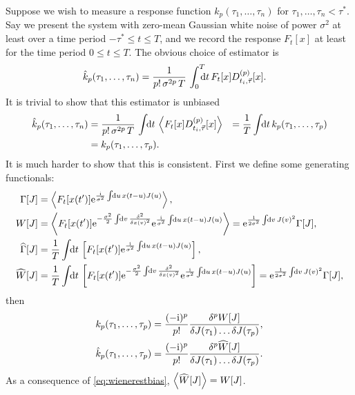 \documentclass[12pt]{article}
\theoremstyle{slplain}
\theoremstyle{sldefinition}
\theoremstyle{remark}
\newcommand{\hz}{\widehat{\Gamma}}
\newcommand{\hw}{\widehat{W}}
\begin{document}
Suppose we wish to measure a response function $k_p(\tau_1,\ldots,\tau_n)$ for $\tau_1,\ldots,\tau_n < \tau^*$. Say we present the system with zero-mean Gaussian white noise of power $\sigma^2$ at least over a time period $-\tau^* \leq t \leq T$, and we record the response $F_t[x]$ at least for the time period $0 \leq t \leq T$. The obvious choice of estimator is
%
\begin{equation}\label{eq:wienerest}
  \begin{aligned}
    \hat{k}_p(\tau_1,\ldots,\tau_n) &= \frac{1}{p!\,\sigma^{2p}\,T} \, \intd[_0^T\!\!]{t} F_t[x] D\rp{p}_{t_i,\vec{\tau}}[x] .
  \end{aligned}
\end{equation}
%
It is trivial to show that this estimator is unbiased
%
\begin{equation}\label{eq:wienerestbias}
  \begin{aligned}
    \hat{k}_p(\tau_1,\ldots,\tau_n) &= \frac{1}{p!\,\sigma^{2p}\,T} \, \intd{t} \av{F_t[x] D\rp{p}_{t_i,\vec{\tau}}[x]}
      &= \frac{1}{T}\intd{t}k_p(\tau_1,\ldots,\tau_p) \\
      &= k_p(\tau_1,\ldots,\tau_p).
  \end{aligned}
\end{equation}
%
It is much harder to show that this is consistent. First we define some generating functionals:
%
\begin{equation}\label{eq:wienergen}
  \begin{aligned}
    \Gamma[J] &= \av{F_t[x(t')] \e^{\frac{\ir}{\sigma^2} \intd{u} x(t-u)J(u)}},  \\
    W[J] &= \av{F_t[x(t')] \e^{-\frac{\sigma^2}{2} \intd{v}\fdf{^2}{x(v)^2}} \e^{\frac{\ir}{\sigma^2} \intd{u} x(t-u)J(u)}}
     = \e^{\frac{1}{2\sigma^2} \intd{v}J(v)^2} \Gamma[J],  \\
    \hz[J] &= \frac{1}{T}\intd{t} \brk{F_t[x(t')] \e^{\frac{\ir}{\sigma^2} \intd{u} x(t-u)J(u)}},  \\
    \hw[J] &= \frac{1}{T}\intd{t} \brk{F_t[x(t')] \e^{-\frac{\sigma^2}{2} \intd{v}\fdf{^2}{x(v)^2}} \e^{\frac{\ir}{\sigma^2} \intd{u} x(t-u)J(u)}}
     = \e^{\frac{1}{2\sigma^2} \intd{v}J(v)^2} \Gamma[J],
  \end{aligned}
\end{equation}
%
then
%
\begin{equation}\label{eq:wienergendiff}
  \begin{aligned}
     k_p(\tau_1,\ldots,\tau_p) &= \frac{(-\ir)^{p}}{p!} \fdf{^p W[J]}{J(\tau_1)\ldots\delta J(\tau_p)}, \\
     \hat{k}_p(\tau_1,\ldots,\tau_p) &= \frac{(-\ir)^{p}}{p!} \fdf{^p \hw[J]}{J(\tau_1)\ldots\delta J(\tau_p)}.
  \end{aligned}
\end{equation}
%
As a consequence of \eqref{eq:wienerestbias}, $\av{\hw[J]}=W[J]$.
\end{document}
